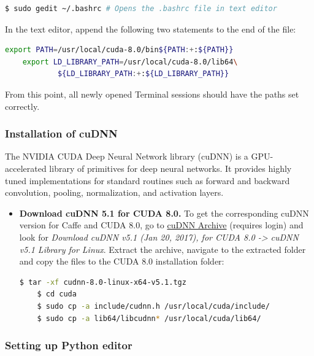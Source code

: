 \begin{itemize}
	\begin{lstlisting}[language=bash]
	$ sudo gedit ~/.bashrc # Opens the .bashrc file in text editor
	\end{lstlisting}
	
	In the text editor, append the following two statements to the end of the file:
	
	\begin{lstlisting}[language=bash]
	export PATH=/usr/local/cuda-8.0/bin${PATH:+:${PATH}}
	export LD_LIBRARY_PATH=/usr/local/cuda-8.0/lib64\
			${LD_LIBRARY_PATH:+:${LD_LIBRARY_PATH}}
	\end{lstlisting}	
	
	From this point, all newly opened Terminal sessions should have the paths set correctly.
	
\end{itemize}

\subsubsection{Installation of cuDNN}

The NVIDIA CUDA Deep Neural Network library (cuDNN) is a GPU-accelerated library of primitives for deep neural networks. It provides highly tuned implementations for standard routines such as forward and backward convolution, pooling, normalization, and activation layers. \cite{nvidia_dev} 

\begin{itemize}
	\item \textbf{Download cuDNN 5.1 for CUDA 8.0.} To get the corresponding cuDNN version for Caffe and CUDA 8.0, go to \href{https://developer.nvidia.com/rdp/cudnn-archive}{cuDNN Archive} (requires login) and look for \textit{Download cuDNN v5.1 (Jan 20, 2017), for CUDA 8.0 -> cuDNN v5.1 Library for Linux}. Extract the archive, navigate to the extracted folder and copy the files to the CUDA 8.0 installation folder: \cite{nvidia_dev} 
	
	\newpage
	\begin{lstlisting}[language=bash]
	$ tar -xf cudnn-8.0-linux-x64-v5.1.tgz 
	$ cd cuda
	$ sudo cp -a include/cudnn.h /usr/local/cuda/include/
	$ sudo cp -a lib64/libcudnn* /usr/local/cuda/lib64/
	\end{lstlisting}	
\end{itemize}

\subsubsection{Setting up Python editor}

